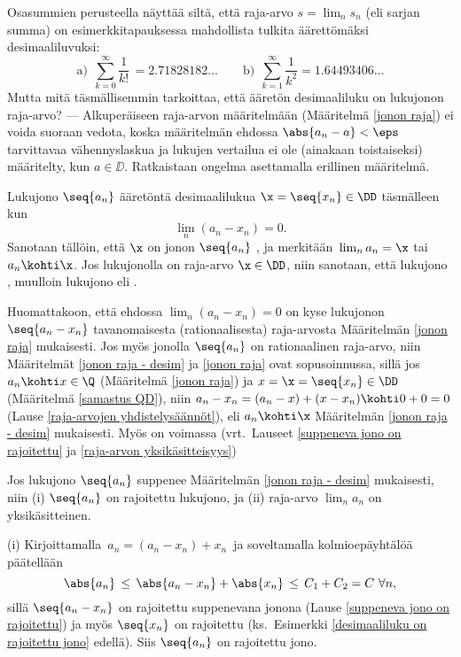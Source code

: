 Osasummien perusteella näyttää siltä, että raja-arvo $s=\lim_n s_n$ (eli sarjan summa) on
esimerkkitapauksessa mahdollista tulkita äärettömäksi desimaaliluvuksi:
\[
\text{a)}\ \ \sum_{k=0}^\infty \frac{1}{k!}\, = 2.71828182 \ldots \qquad
\text{b)}\ \ \sum_{k=1}^\infty \frac{1}{k^2}  = 1.64493406 \ldots
\]
Mutta mitä täsmällisemmin tarkoittaa, että ääretön desimaaliluku on lukujonon raja-arvo?
--- Alkuperäiseen raja-arvon määritelmään (Määritelmä \ref{jonon raja}) ei voida suoraan
vedota, koska määritelmän ehdossa $\abs{a_n-a}<\eps$ tarvittavaa vähennyslaskua ja lukujen
vertailua ei ole (ainakaan toistaiseksi) määritelty, kun $a\in\DD$. Ratkaistaan ongelma
asettamalla erillinen määritelmä.
\begin{Def} \label{jonon raja - desim} 
 
 Lukujono $\seq{a_n}$  ääretöntä
desimaalilukua $\x=\seq{x_n}\in\DD$ täsmälleen kun
\[
\lim_n (a_n-x_n) = 0.
\]
Sanotaan tällöin, että $\x$ on jonon $\seq{a_n}$ , ja merkitään 
$\,\lim_n a_n = \x$ tai $a_n \kohti \x$. Jos lukujonolla on raja-arvo $\x\in\DD$, niin
sanotaan, että lukujono , muulloin lukujono  eli
.
\end{Def}
Huomattakoon, että ehdossa $\lim_n(a_n-x_n)=0$ on kyse lukujonon $\seq{a_n-x_n}$ 
tavanomaisesta (rationaalisesta) raja-arvosta Määritelmän \ref{jonon raja} mukaisesti. 
Jos myös jonolla $\seq{a_n}$ on rationaalinen raja-arvo, niin Määritelmät
\ref{jonon raja - desim} ja \ref{jonon raja}  ovat sopusoinnussa, sillä jos 
$a_n \kohti x\in\Q$ (Määritelmä \ref{jonon raja}) ja $x=\x=\seq{x_n}\in\DD$
(Määritelmä \ref{samastus QD}), niin $a_n-x_n = (a_n-x)+(x-x_n) \kohti 0+0=0$
(Lause \ref{raja-arvojen yhdistelysäännöt}), eli $a_n \kohti \x$ Määritelmän 
\ref{jonon raja - desim} mukaisesti. Myös on voimassa (vrt.\ Lauseet 
\ref{suppeneva jono on rajoitettu} ja \ref{raja-arvon yksikäsitteisyys})
\begin{Lause} \label{raja-arvon yksikäsitteisyys - desim} Jos lukujono $\seq{a_n}$ suppenee
Määritelmän \ref{jonon raja - desim} mukaisesti, niin \newline
(i) $\seq{a_n}$ on rajoitettu lukujono, ja (ii) raja-arvo $\lim_n a_n$ on yksikäsitteinen.
\end{Lause}
\tod (i) Kirjoittamalla $\,a_n=(a_n-x_n)+x_n\,$ ja soveltamalla kolmioepäyhtälöä päätellään
\[
\abs{a_n} \,\le\, \abs{a_n-x_n}+\abs{x_n} \,\le\, C_1+C_2=C\ \forall n,
\]
sillä $\seq{a_n-x_n}$ on rajoitettu suppenevana jonona (Lause 
\ref{suppeneva jono on rajoitettu}) ja myös $\seq{x_n}$ on rajoitettu
(ks.\ Esimerkki \ref{desimaaliluku on rajoitettu jono} edellä). Siis $\seq{a_n}$ on
rajoitettu jono. 

